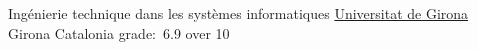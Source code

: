                 {Ing\'enierie technique dans les syst\`emes informatiques}
                {\newline\href{http://www.udg.edu}{Universitat de Girona}}
                {Girona}
                {Catalonia}
                {
grade:~6.9 over 10
}

